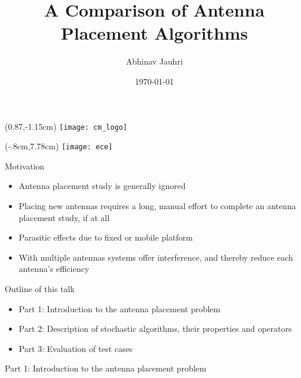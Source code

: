 \documentclass{beamer}
\title{\color{univred} A Comparison of Antenna Placement Algorithms}
\author{Abhinav Jauhri}
\date{\today}
\let\otp\titlepage
\renewcommand{\titlepage}{\otp\addtocounter{framenumber}{-1}}
\begin{document}
\begin{frame}[plain]
    \begin{textblock*}{100mm}(0.87\textwidth,-1.15cm)
        \texttt{[image: cm\_logo]}
    \end{textblock*}
    \begin{textblock*}{10mm}(-.8cm,7.78cm)
        \texttt{[image: ece]}
    \end{textblock*}
    \color{univred}
    \titlepage
\end{frame}

\begin{frame}{Motivation}
\begin{itemize} \itemsep1.5em
        \item Antenna placement study is generally ignored 
        \item Placing new antennas requires a long, manual effort to complete an antenna placement study, if at all
        \item Parasitic effects due to fixed or mobile platform 
        \item With multiple antennas systems offer interference, and thereby reduce each antenna's efficiency
    \end{itemize}
    \vspace{5mm}
\end{frame}

\begin{frame}{Outline of this talk}
    \begin{itemize}
        \setlength\itemsep{2em}
        \item Part 1: Introduction to the antenna placement problem
        \item Part 2: Description of stochastic algorithms, their properties and operators
        \item Part 3: Evaluation of test cases
    \end{itemize}
\end{frame}

\begin{frame}{\null}
    \begin{tcolorbox}[colback=green!5]
        \centering\Huge
        Part 1: Introduction to the antenna placement problem
    \end{tcolorbox}
\end{frame}
\end{document}
